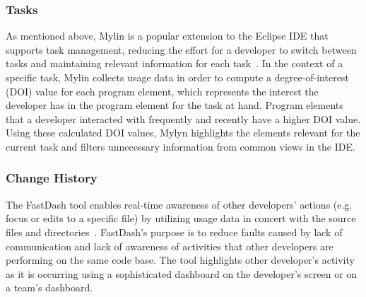 \subsubsection{Tasks}

As mentioned above, Mylin is a popular extension to the Eclipse IDE that supports task
management, reducing the effort for a developer to switch between
tasks and maintaining relevant information for each
task~\cite{Kersten-Mylin}. In the context of a specific task, Mylin
collects usage data in order to compute a degree-of-interest (DOI)
value for each program element, which represents the interest the
developer has in the program element for the task at hand. Program elements that a developer interacted with frequently and recently have a higher DOI value. Using these calculated DOI values, Mylyn highlights the elements relevant for the current task and filters unnecessary information from common views in the IDE. 

\subsubsection{Change History}

The FastDash tool enables real-time awareness of other developers'
actions (e.g. focus or edits to a specific file) by utilizing usage
data in concert with the source files and
directories~\cite{FastDash}. FastDash's purpose is to reduce faults
caused by lack of communication and lack of awareness of activities
that other developers are performing on the same code base. The tool
highlights other developer's activity as it is occurring using a
sophisticated dashboard on the developer's screen or on a team's dashboard.




